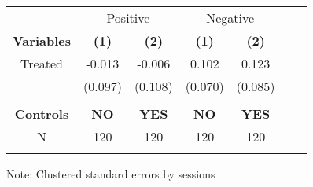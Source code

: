 \begin{table}[htbp]
    \begin{tabular}{c c c c c c c }
    \toprule
    &\multicolumn{2}{c}{Positive}         &\multicolumn{2}{c}{Negative}      \\

    \textbf{Variables} & \textbf{(1)} & \textbf{(2)}  & \textbf{(1)} & \textbf{(2)}              \\ 

    
    \midrule
     Treated           & -0.013      & -0.006      & 0.102      & 0.123  \\
                       & (0.097)     & (0.108)     & (0.070)    & (0.085)   \\
                       &             &             &            &                  \\
\midrule
    
\textbf{Controls} & \textbf{ NO } & \textbf{YES}  & \textbf{ NO } & \textbf{YES}  \\ 

    \midrule
     N                  &   120          &      120  &     120  &     120        \\          
    \bottomrule
    \addlinespace[1ex]
    \multicolumn{3}{l}{\textsuperscript{***}$p<0.01$, 
      \textsuperscript{**}$p<0.05$, 
      \textsuperscript{*}$p<0.1$}
    \end{tabular}
    \newline
    Note: Clustered standard errors by sessions
\end{table}
